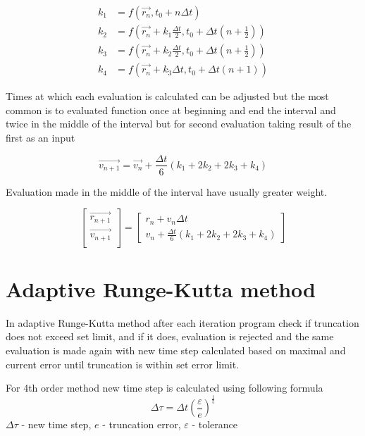 \documentclass[english,12pt,a4paper]{report}
\begin{document}
	\begin{equation}
		\begin{split}
			k_1 &= f(\vec{r_n},  t_0 + n \Delta t)\\
			k_2 &= f\left(\vec{r_n} + k_1 \frac{\Delta t}{2}, t_0 + \Delta t(n + \frac{1}{2})\right)\\
			k_3 &= f\left(\vec{r_n} + k_2 \frac{\Delta t}{2}, t_0 + \Delta t(n + \frac{1}{2})\right)\\
			k_4 &= f\left(\vec{r_n} + k_3 \Delta t, t_0 + \Delta t(n + 1)\right)
		\end{split}
	\end{equation}
	
	Times at which each evaluation is calculated can be adjusted but the most common is to evaluated function once at beginning and end the interval and twice in the middle of the interval but for second evaluation taking result of the first as an input
	
	\begin{equation}
		\vec{v_{n+1}} = \vec{v_n} + \frac{\Delta t}{6}(k_1 + 2 k_2 + 2k_3 + k_4)
	\end{equation}
	
	Evaluation made in the middle of the interval have usually greater weight.	
	
	\begin{equation}
		\begin{bmatrix}
			\vec{r_{n+1}}\\
			\vec{v_{n+1}}\\
		\end{bmatrix}
		=
		\begin{bmatrix}
			r_n + v_n \Delta t\\
			v_n + \frac{\Delta t}{6}(k_1 + 2 k_2 + 2k_3 + k_4)
		\end{bmatrix}
	\end{equation}
	
	\section{Adaptive Runge-Kutta method}
	
	In adaptive Runge-Kutta method after each iteration program check if truncation does not exceed set limit, and if it does, evaluation is rejected and the same evaluation is made again with new time step calculated based on maximal and current error until truncation is within set error limit.
	
	For 4th order method new time step is calculated using following formula
	\begin{equation}
		\Delta \tau = \Delta t \left( \dfrac{\varepsilon}{e} \right) ^{\frac{1}{5}}
	\end{equation}
	$\Delta \tau$ - new time step, $e$ - truncation error, $\varepsilon$ - tolerance
	
\end{document}
